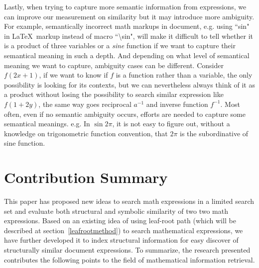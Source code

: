 Lastly, when trying to capture more semantic information from expressions, we can improve our measurement on similarity but it may introduce more ambiguity. 
For example, semantically incorrect math markups in document, e.g. using ``sin" in \LaTeX\ markup instead of macro ``\textbackslash sin", will make it difficult to tell whether it is a product of three variables or a \textit{sine} function if we want to capture their semantical meaning in such a depth. 
And depending on what level of semantical meaning we want to capture, ambiguity cases can be different. 
Consider $f(2x+1)$, if we want to know if $f$ is a function rather than a variable, the only possibility is looking for its contexts, but we can nevertheless always think of it as a product without losing the possibility to search similar expression like $f(1 + 2y)$, the same way goes reciprocal $a^{-1}$ and inverse function $f^{-1}$. 
Most often, even if no semantic ambiguity occurs, efforts are needed to capture some semantical meanings. e.g. In $\sin 2 \pi$, it is not easy to figure out,
 without a knowledge on trigonometric function convention, that $2 \pi$ is the subordinative of sine function.

\section{Contribution Summary}
This paper has proposed new ideas to search math expressions in a limited search set and evaluate both structural and symbolic similarity of two two math expressions.
Based on an existing idea of using leaf-root path (which will be described at section~\ref{leafrootmethod}) to search mathematical expressions, we have further developed it to index structural information for easy discover of structurally similar document expressions. 
To summarize, the research presented contributes the following points to the field of mathematical information retrieval.

